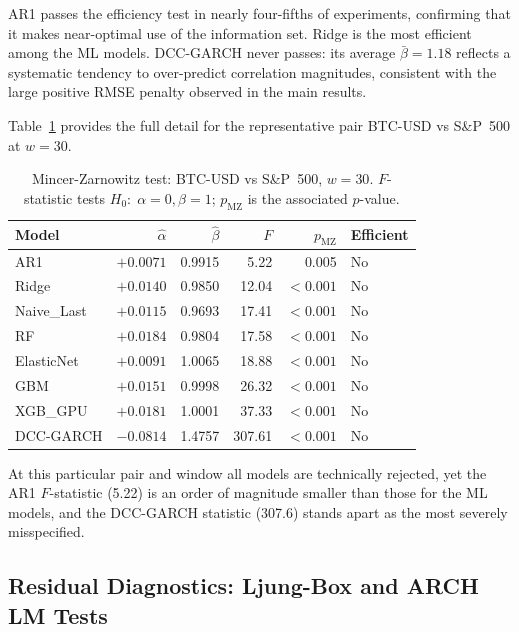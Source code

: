 AR1 passes the efficiency test in nearly four-fifths of experiments, confirming
that it makes near-optimal use of the information set.
Ridge is the most efficient among the ML models.
DCC-GARCH never passes: its average $\bar{\beta} = 1.18$ reflects a systematic
tendency to over-predict correlation magnitudes, consistent with the large
positive RMSE penalty observed in the main results.

Table~\ref{tab:mz_gspc_w30} provides the full detail for the representative
pair BTC-USD vs S\&P~500 at $w = 30$.

\begin{table}[H]
    \centering
    \caption{Mincer-Zarnowitz test: BTC-USD vs S\&P~500, $w = 30$.
             $F$-statistic tests $H_0{:}\;\alpha=0, \beta=1$; $p_\text{MZ}$ is
             the associated $p$-value.}
    \label{tab:mz_gspc_w30}
    \begin{tabular}{lrrrrl}
        \toprule
        Model & $\hat{\alpha}$ & $\hat{\beta}$ & $F$ & $p_\text{MZ}$ & Efficient \\
        \midrule
        AR1         & $+0.0071$ & 0.9915 &   5.22 & 0.005 & No  \\
        Ridge       & $+0.0140$ & 0.9850 &  12.04 & $<0.001$ & No  \\
        Naive\_Last & $+0.0115$ & 0.9693 &  17.41 & $<0.001$ & No  \\
        RF          & $+0.0184$ & 0.9804 &  17.58 & $<0.001$ & No  \\
        ElasticNet  & $+0.0091$ & 1.0065 &  18.88 & $<0.001$ & No  \\
        GBM         & $+0.0151$ & 0.9998 &  26.32 & $<0.001$ & No  \\
        XGB\_GPU    & $+0.0181$ & 1.0001 &  37.33 & $<0.001$ & No  \\
        DCC-GARCH   & $-0.0814$ & 1.4757 & 307.61 & $<0.001$ & No  \\
        \bottomrule
    \end{tabular}
\end{table}

At this particular pair and window all models are technically rejected, yet the
AR1 $F$-statistic (5.22) is an order of magnitude smaller than those for the
ML models, and the DCC-GARCH statistic (307.6) stands apart as the most
severely misspecified.

\subsection{Residual Diagnostics: Ljung-Box and ARCH LM Tests}

